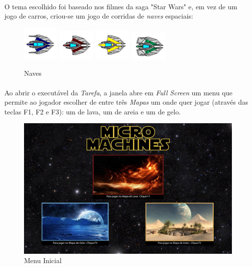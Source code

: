 \documentclass[12pt,a4paper]{report}
\begin{document}
\paragraph{} O tema escolhido foi baseado nos filmes da saga "Star Wars" e, em vez de um jogo de carros, criou-se um jogo de corridas de \textit{naves} espaciais: 

\begin{figure}[H]
\caption{Naves}
\centering
\includegraphics[scale = 4]{naveAzul.png}
\includegraphics[scale = 4]{naveVermelha.png}
\includegraphics[scale = 4]{naveAmarela.png}
\includegraphics[scale = 4]{naveVerde.png}
\end{figure}


\paragraph{} Ao abrir o executável da \textit{Tarefa}, a janela abre em \textit{Full Screen} um menu que permite ao jogador escolher de entre três \textit{Mapas} um onde quer jogar (através das teclas F1, F2 e F3): um de lava, um de areia e um de gelo.

\begin{figure}[H]
\caption{Menu Inicial}
\centering
\includegraphics[scale = 0.27]{menu.png}
\end{figure}
\end{document}
